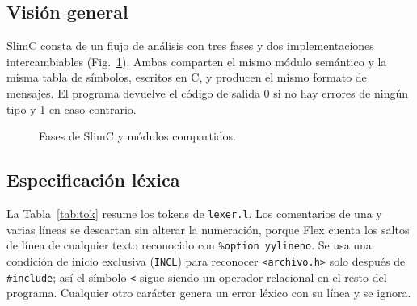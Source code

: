 \documentclass[runningheads]{llncs}
\begin{document}
\subsection{Visión general}
SlimC consta de un flujo de análisis con tres fases y dos implementaciones intercambiables (Fig.~\ref{fig:arq}). Ambas comparten el mismo módulo semántico y la misma tabla de símbolos, escritos en C, y producen el mismo formato de mensajes. El programa devuelve el código de salida 0 si no hay errores de ningún tipo y 1 en caso contrario.

\begin{figure}[t]
\centering
{}
\caption{Fases de SlimC y módulos compartidos.}\label{fig:arq}
\end{figure}

\subsection{Especificación léxica}
La Tabla~\ref{tab:tok} resume los tokens de \texttt{lexer.l}. Los comentarios de una y varias líneas se descartan sin alterar la numeración, porque Flex cuenta los saltos de línea de cualquier texto reconocido con \texttt{\%option yylineno}. Se usa una condición de inicio exclusiva (\texttt{INCL}) para reconocer \texttt{<archivo.h>} solo después de \texttt{\#include}; así el símbolo \texttt{<} sigue siendo un operador relacional en el resto del programa. Cualquier otro carácter genera un error léxico con su línea y se ignora.
\end{document}
